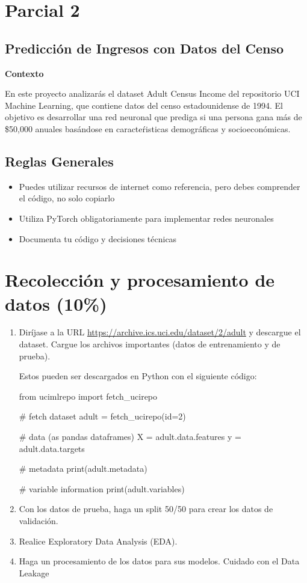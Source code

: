 \documentclass[12pt,a4paper]{article}
\begin{document}
\section*{Parcial 2}

\subsection*{Predicción de Ingresos con Datos del Censo}

\textbf{Contexto}

En este proyecto analizarás el dataset Adult Census Income del repositorio UCI Machine Learning,
que contiene datos del censo estadounidense de 1994. El objetivo es desarrollar una red neuronal
que prediga si una persona gana más de \$50{,}000 anuales basándose en caracteŕisticas demográficas y
socioeconómicas.

\subsection*{Reglas Generales}

\begin{itemize}
\item Puedes utilizar recursos de internet como referencia, pero debes comprender el código, no solo copiarlo
\item Utiliza PyTorch obligatoriamente para implementar redes neuronales
\item Documenta tu código y decisiones técnicas
\end{itemize}

\section{Recolección y procesamiento de datos (10\%)}

\begin{enumerate}
\item Diríjase a la URL \href{https://archive.ics.uci.edu/dataset/2/adult}{https://archive.ics.uci.edu/dataset/2/adult} y descargue el dataset. Cargue los archivos importantes (datos de entrenamiento y de prueba).

Estos pueden ser descargados en Python con el siguiente código:

from ucimlrepo import fetch_ucirepo 
  
# fetch dataset 
adult = fetch_ucirepo(id=2) 
  
# data (as pandas dataframes) 
X = adult.data.features 
y = adult.data.targets 
  
# metadata 
print(adult.metadata) 
  
# variable information 
print(adult.variables) 


\item Con los datos de prueba, haga un split 50/50 para crear los datos de validación.
\item Realice Exploratory Data Analysis (EDA).
\item Haga un procesamiento de los datos para sus modelos. Cuidado con el Data Leakage
\end{enumerate}
\end{document}
